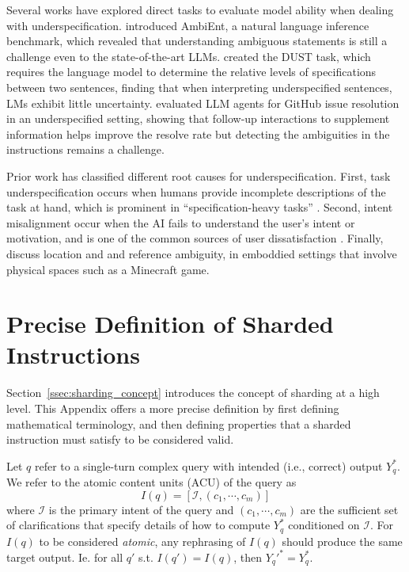 \documentclass{article}
\begin{document}
\begin{appendices}
Several works have explored direct tasks to evaluate model ability when dealing with underspecification. \citet{liu2023we} introduced AmbiEnt, a natural language inference benchmark, which revealed that understanding ambiguous statements is still a challenge even to the state-of-the-art LLMs. \citet{Wildenburg2024DoPL} created the DUST task, which requires the language model to determine the relative levels of specifications between two sentences, finding that when interpreting underspecified sentences, LMs exhibit little uncertainty.
\citet{vijayvargiya2025interactive} evaluated LLM agents for GitHub issue resolution in an underspecified setting, showing that follow-up interactions to supplement information helps improve the resolve rate but detecting the ambiguities in the instructions remains a challenge.

Prior work has classified different root causes for underspecification. First, task underspecification occurs when humans provide incomplete descriptions of the task at hand, which is prominent in ``specification-heavy tasks'' \cite{Peng2023WhenDI}. Second, intent misalignment occur when the AI fails to understand the user's intent or motivation, and is one of the common sources of user dissatisfaction \cite{Kim2024BeyondPL,Terry2023InteractiveAA}. Finally, \citet{Chaturvedi2024NeBuLaAD} discuss location and and reference ambiguity, in emboddied settings that involve physical spaces such as a Minecraft game.



\section{Precise Definition of Sharded Instructions} \label{app:sharded_definition}

Section~\ref{ssec:sharding_concept} introduces the concept of sharding at a high level. This Appendix offers a more precise definition by first defining mathematical terminology, and then defining properties that a sharded instruction must satisfy to be considered valid.

Let $q$ refer to a single-turn complex query with intended (i.e., correct) output $Y_q^*$. We refer to the atomic content units (ACU) \cite{liu2022revisiting} of the query as 
\[I(q)=[\mathcal{I},({c}_1, \cdots, c_m )]\]
where $\mathcal{I}$ is the primary intent of the query and $(c_1, \cdots, c_m )$ are the sufficient set of clarifications that specify details of how to compute $Y_q^*$ conditioned on $\mathcal{I}$. For $I(q)$ to be considered {\em atomic}, any rephrasing of $I(q)$ should produce the same target output. Ie. for all $q'$ s.t. $I(q')=I(q)$, then $Y_{q}'^* = Y_q^*$. 


\end{appendices}
\end{document}
